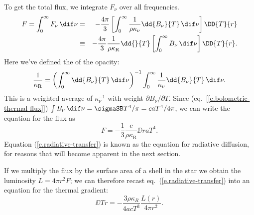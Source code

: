 To get the total flux, we integrate $F_{\nu}$ over all frequencies. 
\begin{eqnarray*}
	F = \int_{0}^{\infty}F_{\nu}\,\dif\nu &=& -\frac{4\pi}{3} \left[\int_{0}^{\infty} \frac{1}{\rho\kappa_{\nu}}\dd{B_{\nu}}{T}\,\dif\nu\right]\DD{T}{r}\\
	&\equiv& -\frac{4\pi}{3}\frac{1}{\rho\kappa_{\mathrm{R}}}\dd{}{T}\left[\int_{0}^{\infty}B_{\nu}\,\dif\nu\right]\DD{T}{r}.
\end{eqnarray*}
Here we've defined the  of the opacity:
\begin{equation}\label{e.rosseland-opacity}
	\frac{1}{\kappa_{\mathrm{R}}} = \left(\int_{0}^{\infty} \dd{B_{\nu}}{T}\,\dif\nu\right)^{-1}\int_{0}^{\infty} \frac{1}{\kappa_{\nu}}\dd{B_{\nu}}{T}\,\dif\nu.
\end{equation}
This is a weighted average of $\kappa_{\nu}^{-1}$ with weight $\partial B_{\nu}/\partial T$. Since (eq.~[\ref{e.bolometric-thermal-flux}]) $\int B_{\nu}\,\dif\nu = \sigmaSB T^{4}/\pi = c a T^{4}/4\pi$, we can write the equation for the flux as
\begin{equation}
	F = -\frac{1}{3}\frac{c}{\rho\kappa_{\mathrm{R}}}\DD{}{r}aT^{4}.
\label{e.radiative-transfer}
\end{equation}
Equation (\ref{e.radiative-transfer}) is known as the equation for radiative diffusion, for reasons that will become apparent in the next section.

If we multiply the flux by the surface area of a shell in the star we obtain the luminosity $L = 4\pi r^{2} F$; we can therefore recast eq.~(\ref{e.radiative-transfer}) into an equation for the thermal gradient:
\begin{equation}
    \label{e.gradient-temperature}
    \DD{T}{r} = -\frac{3\rho\kappa_{R}}{4acT^3}\frac{L(r)}{4\pi r^2}.
\end{equation}

